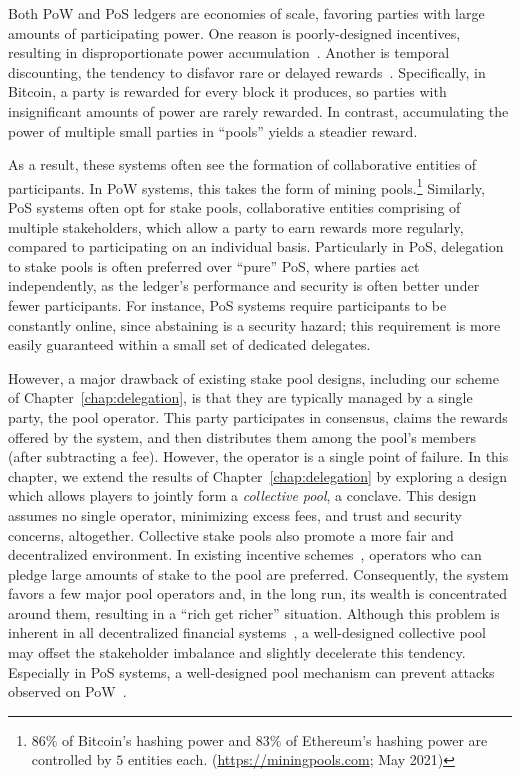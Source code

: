 Both PoW and PoS ledgers are economies of scale, favoring parties with large
amounts of participating power. One reason is poorly-designed incentives,
resulting in disproportionate power
accumulation~\cite{karakostas2019cryptocurrency,FC:FKORVW19}. Another is
temporal discounting, \ie the tendency to disfavor rare or delayed
rewards~\cite{Reed2011}. Specifically, in Bitcoin, a party is rewarded for
every block it produces, so parties with insignificant amounts of power are
rarely rewarded. In contrast, accumulating the power of multiple small parties
in ``pools'' yields a steadier reward.

As a result, these systems often see the formation of collaborative entities of
participants. In PoW systems, this takes the form of mining
pools.\footnote{$86$\% of Bitcoin's hashing power and $83$\% of Ethereum's
hashing power are controlled by $5$ entities each.
(\url{https://miningpools.com}; May 2021)} Similarly, PoS systems often opt for
stake pools, \ie collaborative entities comprising of multiple stakeholders,
which allow a party to earn rewards more regularly, compared to participating
on an individual basis.  Particularly in PoS, delegation to stake pools is
often preferred over ``pure'' PoS, where parties act independently, as the
ledger's performance and security is often better under fewer participants. For
instance, PoS systems require participants to be constantly online, since
abstaining is a security hazard; this requirement is more easily guaranteed
within a small set of dedicated delegates.

However, a major drawback of existing stake pool designs, including our scheme
of Chapter~\ref{chap:delegation}, is that they are typically managed by a
single party, \ie the pool operator. This party participates in consensus,
claims the rewards offered by the system, and then distributes them among the
pool's members (after subtracting a fee). However, the operator is a single
point of failure. In this chapter, we extend the results of
Chapter~\ref{chap:delegation} by exploring a design which allows players to
jointly form a \emph{collective pool}, \ie a conclave. This design assumes no
single operator, minimizing excess fees, and trust and security concerns,
altogether. Collective stake pools also promote a more fair and decentralized
environment. In existing incentive
schemes~\cite{DBLP:conf/eurosp/BrunjesKKS20}, operators who can pledge large
amounts of stake to the pool are preferred. Consequently, the system favors a
few major pool operators and, in the long run, its wealth is concentrated
around them, resulting in a ``rich get richer'' situation. Although this
problem is inherent in all decentralized financial
systems~\cite{karakostas2019cryptocurrency}, a well-designed collective pool
may offset the stakeholder imbalance and slightly decelerate this tendency.
Especially in PoS systems, a well-designed pool mechanism can prevent attacks
observed on PoW~\cite{FCW:JLGVM14,FC:WalCli14,FCW:LasJohGro15}.
